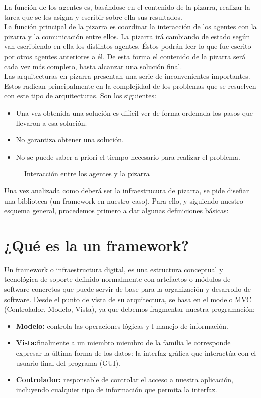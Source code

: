 La función de los agentes es, basándose en el contenido de la pizarra, realizar la tarea que se les asigna y escribir sobre ella sus resultados.\\

La función principal de la pizarra es coordinar la interacción de los agentes con la pizarra y la comunicación entre ellos. La pizarra irá cambiando de estado según van escribiendo en ella los distintos agentes. Éstos podrán leer lo que fue escrito por otros agentes anteriores a él. De esta forma el contenido de la pizarra será cada vez más completo, hasta alcanzar una solución final.\\

Las arquitecturas en pizarra presentan una serie de inconvenientes importantes. Estos radican principalmente en la complejidad de los problemas que se resuelven con este tipo de arquitecturas. Son los siguientes:

\begin{itemize}
	\item Una vez obtenida una solución es difícil ver de forma ordenada los pasos que llevaron a esa solución.
	\item No garantiza obtener una solución.
	\item No se puede saber a priori el tiempo necesario para realizar el problema.
\end{itemize}

\begin{figure}[!h]
\centering
\pizarra
\caption{Interacción entre los agentes y la pizarra}
\end{figure}

Una vez analizada como deberá ser la infraestrucura de pizarra, se pide diseñar una biblioteca (un framework en nuestro caso). Para ello, y siguiendo nuestro esquema general, procedemos primero a dar algunas definiciones básicas:\\

\section{¿Qué es la un framework?}
Un framework o infraestructura digital, es una estructura conceptual y tecnológica de soporte definido normalmente con artefactos o módulos de software concretos que puede servir de base para la organización y desarrollo de software.
Desde el punto de vista de su arquitectura, se basa en el modelo MVC (Controlador, Modelo, Vista), ya que debemos fragmentar nuestra programación:


\begin{itemize}
\item \textbf{Modelo:} controla las operaciones lógicas y l manejo de información.
\item \textbf{Vista:}finalmente a un miembro miembro de la familia le corresponde expresar la última forma de los datos: la interfaz gráfica que interactúa con el usuario final del programa (GUI).
\item \textbf{Controlador:} responsable de controlar el acceso a nuestra aplicación, incluyendo cualquier tipo de información que permita la interfaz.
\end{itemize}

